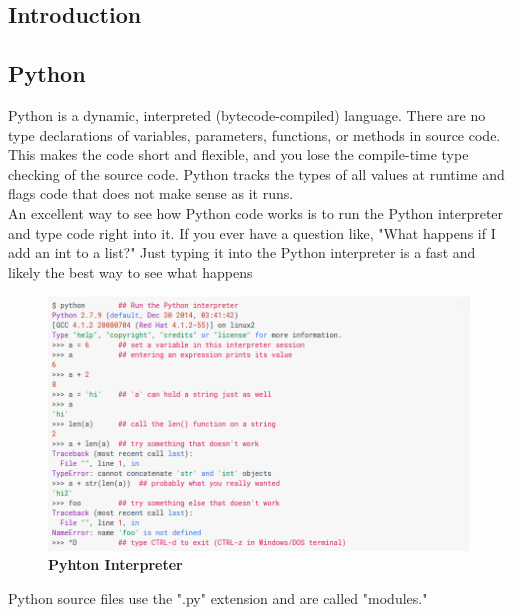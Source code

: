\documentclass[11pt]{article}
\begin{document}
\begin{center} 
\renewcommand*\contentsname{Table Of Contents}
\tableofcontents
\newpage
\listoffigures
\newpage
\end{center}
\newpage
\begin{center}
\section{Introduction}
\end{center}
\bigskip
\subsection{Python}
\begin{flushleft}
Python is a dynamic, interpreted (bytecode-compiled) language. There are no type declarations of variables, parameters, functions, or methods in source code. This makes the code short and flexible, and you lose the compile-time type checking of the source code. Python tracks the types of all values at runtime and flags code that does not make sense as it runs.\\\bigskip
An excellent way to see how Python code works is to run the Python interpreter and type code right into it. If you ever have a question like, "What happens if I add an int to a list?" Just typing it into the Python interpreter is a fast and likely the best way to see what happens\bigskip\\
\begin{figure}[h]
\includegraphics[scale=0.5]{python}
\centering
\caption{\textbf {Pyhton Interpreter}}
\end{figure}
Python source files use the ".py" extension and are called "modules."

\end{flushleft}
\end{document}
